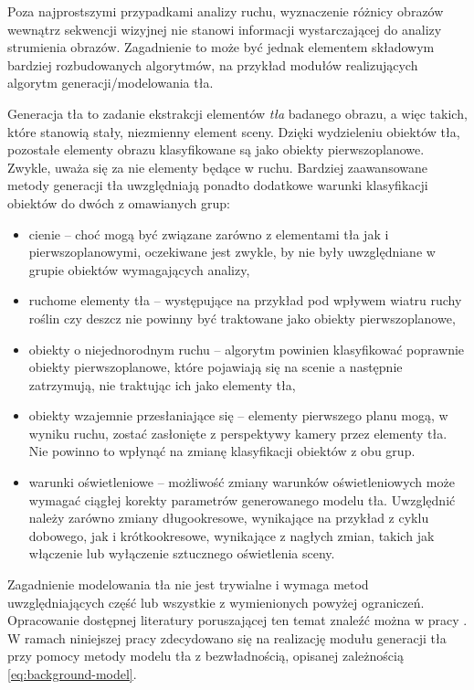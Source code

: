 Poza najprostszymi przypadkami analizy ruchu, wyznaczenie różnicy obrazów wewnątrz sekwencji wizyjnej nie stanowi informacji wystarczającej do analizy strumienia obrazów. %
Zagadnienie to może być jednak elementem składowym bardziej rozbudowanych algorytmów, na przykład modułów realizujących algorytm generacji/modelowania tła. %

Generacja tła to zadanie ekstrakcji elementów \textit{tła} badanego obrazu, a więc takich, które stanowią stały, niezmienny element sceny. 
Dzięki wydzieleniu obiektów tła, pozostałe elementy obrazu klasyfikowane są jako obiekty pierwszoplanowe. 
Zwykle, uważa się za nie elementy będące w ruchu. %
Bardziej zaawansowane metody generacji tła uwzględniają ponadto dodatkowe warunki klasyfikacji obiektów do dwóch z omawianych grup:
\begin{itemize}
	\item cienie -- choć mogą być związane zarówno z elementami tła jak i pierwszoplanowymi, oczekiwane jest zwykle, by nie były uwzględniane w grupie obiektów wymagających analizy,
	\item ruchome elementy tła -- występujące na przykład pod wpływem wiatru ruchy roślin czy deszcz nie powinny być traktowane jako obiekty pierwszoplanowe,
	\item obiekty o niejednorodnym ruchu -- algorytm powinien klasyfikować poprawnie obiekty pierwszoplanowe, które pojawiają się na scenie a następnie zatrzymują, nie traktując ich jako elementy tła, %
	\item obiekty wzajemnie przesłaniające się -- elementy pierwszego planu mogą, w wyniku ruchu, zostać zasłonięte z perspektywy kamery przez elementy tła. Nie powinno to wpłynąć na zmianę klasyfikacji obiektów z obu grup.
	\item warunki oświetleniowe -- możliwość zmiany warunków oświetleniowych może wymagać ciągłej korekty parametrów generowanego modelu tła. Uwzględnić należy zarówno zmiany długookresowe, wynikające na przykład z cyklu dobowego, jak i krótkookresowe, wynikające z nagłych zmian, takich jak włączenie lub wyłączenie sztucznego oświetlenia sceny.
\end{itemize}

Zagadnienie modelowania tła nie jest trywialne i wymaga metod uwzględniających część lub wszystkie z wymienionych powyżej ograniczeń. 
Opracowanie dostępnej literatury poruszającej ten temat znaleźć można w pracy \cite{Kryjak2012}.
W ramach niniejszej pracy zdecydowano się na realizację modułu generacji tła przy pomocy metody modelu tła z bezwładnością, opisanej zależnością \eqref{eq:background-model}. %

